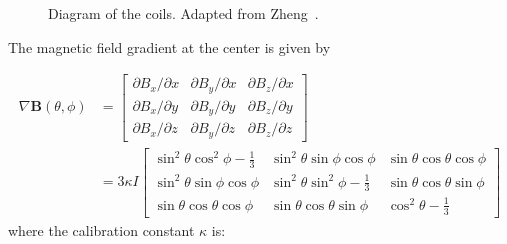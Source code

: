\begin{figure}[t!]
	\centering
	\caption{{Diagram of the coils. Adapted from Zheng~\cite{YuanThesis}.}}
	\label{gradient_coils}
\end{figure}

The magnetic field gradient at the center is given by\cite{PhysRevA.37.2877}

\begin{equation}\label{gradient}
\begin{split}
\nabla\boldsymbol{B}(\theta, \phi)
&=\begin{bmatrix}
\partial B_x/\partial x & \partial B_y/\partial x & \partial B_z/\partial x \\
\partial B_x/\partial y & \partial B_y/\partial y & \partial B_z/\partial y \\
\partial B_x/\partial z & \partial B_y/\partial z & \partial B_z/\partial z
\end{bmatrix}\\
&=3\kappa I
\begin{bmatrix}
\sin^2\theta \cos^2\phi-\frac{1}{3} & \sin^2\theta \sin\phi \cos\phi & \sin\theta \cos\theta \cos\phi \\
\sin^2\theta \sin\phi \cos\phi & \sin^2\theta \sin^2\phi-\frac{1}{3} & \sin\theta \cos\theta \sin\phi \\
\sin\theta \cos\theta \cos\phi & \sin\theta \cos\theta \sin\phi & \cos^2\theta-\frac{1}{3}
\end{bmatrix}
\end{split}
\end{equation}
where the calibration constant $\kappa$ is:

